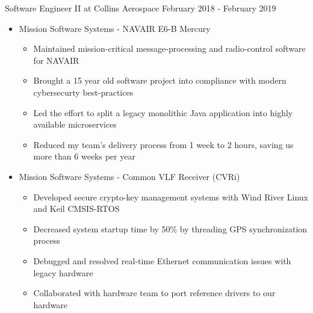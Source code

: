 Software Engineer II at Collins Aerospace
\hfill
February 2018 - February 2019
\begin{itemize}
    \item Mission Software Systems - NAVAIR E6-B Mercury
    \begin{itemize}
			\item Maintained mission-critical message-processing and radio-control software for NAVAIR
			\item Brought a 15 year old software project into compliance with modern cybersecurty best-practices
			\item Led the effort to split a legacy monolithic Java application into highly available microservices
			\item Reduced my team's delivery process from 1 week to 2 hours, saving us more than 6 weeks per year
    \end{itemize}
	\item Mission Software Systems - Common VLF Receiver (CVRi)
    \begin{itemize}
			\item Developed secure crypto-key management systems with Wind River Linux and Keil CMSIS-RTOS
			\item Decreased system startup time by 50\% by threading GPS synchronization process
			\item Debugged and resolved real-time Ethernet communication issues with legacy hardware 
			\item Collaborated with hardware team to port reference drivers to our hardware
		\end{itemize}
\end{itemize}
